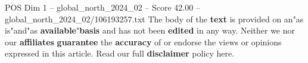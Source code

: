 \begin{textsample}{POS Dim 1 – global\_north\_2024\_02 – Score 42.00 – global\_north\_2024\_02/106193257.txt}
The body of the \textbf{text} is provided on an"as is"and"as \textbf{available}"\textbf{basis} and has not been \textbf{edited} in any way.
Neither we nor our \textbf{affiliates} \textbf{guarantee} the \textbf{accuracy} of or endorse the views or opinions expressed in this article.
Read our full \textbf{disclaimer} policy here.

\end{textsample}
